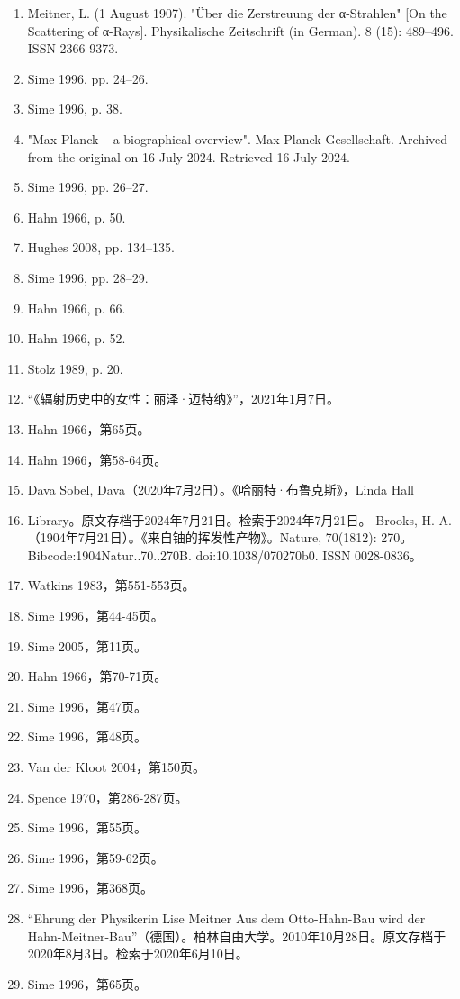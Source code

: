 \begin{enumerate}
\item Meitner, L. (1 August 1907). "Über die Zerstreuung der α-Strahlen" [On the Scattering of α-Rays]. Physikalische Zeitschrift (in German). 8 (15): 489–496. ISSN 2366-9373.
\item Sime 1996, pp. 24–26.
\item Sime 1996, p. 38.
\item "Max Planck – a biographical overview". Max-Planck Gesellschaft. Archived from the original on 16 July 2024. Retrieved 16 July 2024.
\item Sime 1996, pp. 26–27.
\item Hahn 1966, p. 50.
\item Hughes 2008, pp. 134–135.
\item Sime 1996, pp. 28–29.
\item Hahn 1966, p. 66.
\item Hahn 1966, p. 52.
\item Stolz 1989, p. 20.
\item “《辐射历史中的女性：丽泽·迈特纳》”，2021年1月7日。
\item Hahn 1966，第65页。
\item Hahn 1966，第58-64页。
\item Dava Sobel, Dava（2020年7月2日）。《哈丽特·布鲁克斯》，Linda Hall \item Library。原文存档于2024年7月21日。检索于2024年7月21日。
Brooks, H. A.（1904年7月21日）。《来自铀的挥发性产物》。Nature, 70(1812): 270。Bibcode:1904Natur..70..270B. doi:10.1038/070270b0. ISSN 0028-0836。
\item Watkins 1983，第551-553页。
\item Sime 1996，第44-45页。
\item Sime 2005，第11页。
\item Hahn 1966，第70-71页。
\item Sime 1996，第47页。
\item Sime 1996，第48页。
\item Van der Kloot 2004，第150页。
\item Spence 1970，第286-287页。
\item Sime 1996，第55页。
\item Sime 1996，第59-62页。
\item Sime 1996，第368页。
\item “Ehrung der Physikerin Lise Meitner Aus dem Otto-Hahn-Bau wird der Hahn-Meitner-Bau”（德国）。柏林自由大学。2010年10月28日。原文存档于2020年8月3日。检索于2020年6月10日。
\item Sime 1996，第65页。

\end{enumerate}
